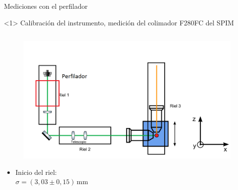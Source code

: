 \begin{frame}{Mediciones con el perfilador}

    \begin{onlyenv}<1>
        Calibración del instrumento, medición del colimador F280FC del SPIM
        \begin{columns}[t]
            \begin{column}{0.5\textwidth}
                \begin{figure}[H]
                \centering
                \includegraphics[width=\textwidth]{fig/perfilador/spim_riel_perfilador.png}
                \label{fig:spim_riel_perfilador}
                \end{figure}
                
                 \begin{itemize}
                    \item Inicio del riel:\\ $\sigma = (3,03 \pm 0,15)\,\text{mm}$
                \end{itemize}
                
            \end{column}


\end{columns}
\end{onlyenv}
\end{frame}
